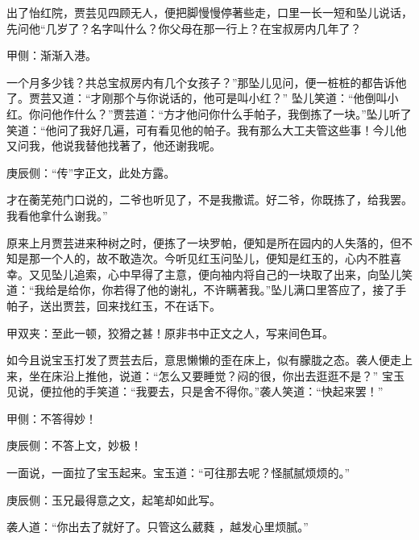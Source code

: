 \begin{parag}
    出了怡红院，贾芸见四顾无人，便把脚慢慢停著些走，口里一长一短和坠儿说话，先问他“几岁了？名字叫什么？你父母在那一行上？在宝叔房内几年了？\begin{note}甲侧：渐渐入港。\end{note}一个月多少钱？共总宝叔房内有几个女孩子？”那坠儿见问，便一桩桩的都告诉他了。贾芸又道：“才刚那个与你说话的，他可是叫小红？” 坠儿笑道：“他倒叫小红。你问他作什么？”贾芸道：“方才他问你什么手帕子，我倒拣了一块。”坠儿听了笑道：“他问了我好几遍，可有看见他的帕子。我有那么大工夫管这些事！今儿他又问我，他说我替他找著了，他还谢我呢。\begin{note}庚辰侧：“传”字正文，此处方露。\end{note}才在蘅芜苑门口说的，二爷也听见了，不是我撒谎。好二爷，你既拣了，给我罢。我看他拿什么谢我。”
\end{parag}


\begin{parag}
    原来上月贾芸进来种树之时，便拣了一块罗帕，便知是所在园内的人失落的，但不知是那一个人的，故不敢造次。今听见红玉问坠儿，便知是红玉的，心内不胜喜幸。又见坠儿追索，心中早得了主意，便向袖内将自己的一块取了出来，向坠儿笑道：“我给是给你，你若得了他的谢礼，不许瞒著我。”坠儿满口里答应了，接了手帕子，送出贾芸，回来找红玉，不在话下。\begin{note}甲双夹：至此一顿，狡猾之甚！原非书中正文之人，写来间色耳。\end{note}
\end{parag}


\begin{parag}
    如今且说宝玉打发了贾芸去后，意思懒懒的歪在床上，似有朦胧之态。袭人便走上来，坐在床沿上推他，说道：“怎么又要睡觉？闷的很，你出去逛逛不是？” 宝玉见说，便拉他的手笑道：“我要去，只是舍不得你。”袭人笑道：“快起来罢！”\begin{note}甲侧：不答得妙！\end{note}\begin{note}庚辰侧：不答上文，妙极！\end{note}一面说，一面拉了宝玉起来。宝玉道：“可往那去呢？怪腻腻烦烦的。”\begin{note}庚辰侧：玉兄最得意之文，起笔却如此写。\end{note}袭人道：“你出去了就好了。只管这么葳蕤 ，越发心里烦腻。”
\end{parag}


